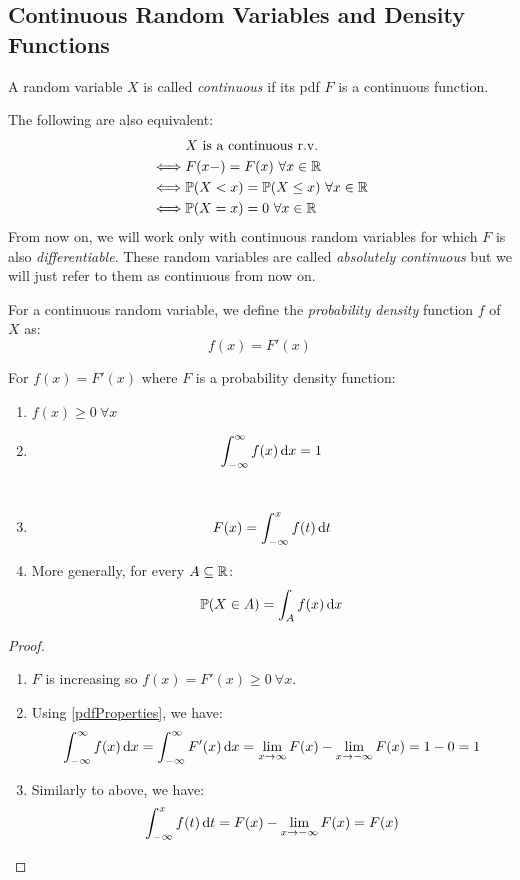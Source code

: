 \documentclass[../main.tex]{subfiles}
\begin{document}
\subsection{Continuous Random Variables and Density Functions}
\begin{definition}
  A random variable $X$ is called \textit{continuous} if its pdf $F$ is a continuous function.
\end{definition}
The following are also equivalent:
\begin{align*}
  & X \text{ is a continuous r.v.} \\
  \iff& F(x-) = F(x)\ \forall x \in \mathbb{R} \\
  \iff& \mathbb{P}(X < x) = \mathbb{P}(X \leq x)\ \forall x \in \mathbb{R} \\
  \iff& \mathbb{P}(X = x) = 0\ \forall x \in \mathbb{R}
\end{align*}
From now on, we will work only with continuous random variables for which $F$ is also \textit{differentiable}.
These random variables are called \textit{absolutely continuous} but we will just refer to them as continuous from now on.
\begin{definition}
  For a continuous random variable, we define the \textit{probability density} function $f$ of $X$ as:
  \[
    f(x) = F'(x)
  \]
\end{definition}
\begin{proposition}
  For $f(x) = F'(x)$ where $F$ is a probability density function:
  \begin{enumerate}
    \item $f(x) \geq 0\ \forall x$ \\
    \item
      \[
        \int_{-\infty}^{\infty} f(x) \d{x} = 1
      \]
      \\
    \item
      \[
        F(x) = \int_{-\infty}^{x} f(t) \d{t}
      \]
    \item More generally, for every $A \subseteq \mathbb{R}$:
      \[
        \P(X \in A) = \int_{A} f(x) \d{x}
      \]
  \end{enumerate}
\end{proposition}
\begin{proof}
  \begin{enumerate}
    \item $F$ is increasing so $f(x) = F'(x) \geq 0\ \forall x$.
    \item Using \cref{pdfProperties}, we have:
      \[
        \int_{-\infty}^{\infty} f(x) \d{x} = \int_{-\infty}^{\infty} F'(x) \d{x} = \lim_{x \to \infty} F(x) - \lim_{x \to -\infty} F(x) = 1 - 0 = 1
      \]
    \item Similarly to above, we have:
      \[
        \int_{-\infty}^{x} f(t) \d{t} = F(x) - \lim_{x \to -\infty} F(x) = F(x)
      \]
  \end{enumerate}
\end{proof}
\end{document}
